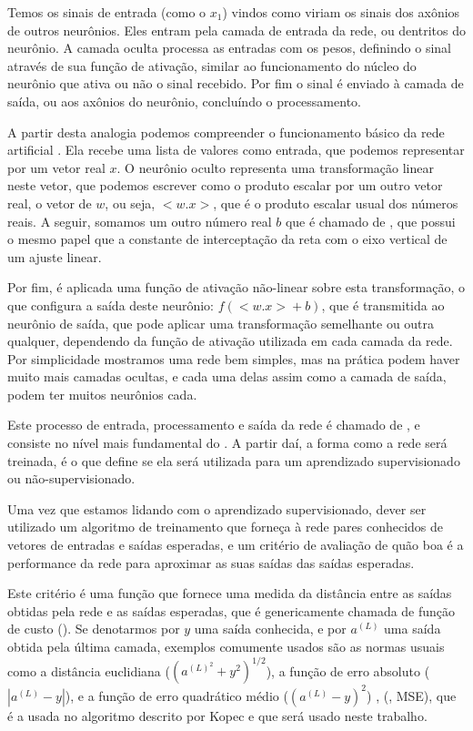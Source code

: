 Temos os sinais de entrada (como o $x_1$) vindos como viriam os sinais dos axônios de outros neurônios. Eles entram pela camada de entrada da rede, ou dentritos do neurônio. A camada oculta processa as entradas com os pesos, definindo o sinal através de sua função de ativação, similar ao funcionamento do núcleo do neurônio que ativa ou não o sinal recebido. Por fim o sinal é enviado à camada de saída, ou aos axônios do neurônio, concluíndo o processamento.

A partir desta analogia podemos compreender o funcionamento básico da rede artificial . Ela recebe uma lista de valores como entrada, que podemos representar por um vetor real $x$. O neurônio oculto representa uma transformação linear neste vetor, que podemos escrever como o produto escalar por um outro vetor real, o vetor de  $w$, ou seja, $<w.x>$, que é o produto escalar usual dos números reais. A seguir, somamos um outro número real $b$ que é chamado de , que possui o mesmo papel que a constante de interceptação da reta com o eixo vertical de um ajuste linear.

Por fim, é aplicada uma função de ativação não-linear sobre esta transformação, o que configura a saída deste neurônio: $f({<w.x>} + b)$, que é transmitida ao neurônio de saída, que pode aplicar uma transformação semelhante ou outra qualquer, dependendo da função de ativação utilizada em cada camada da rede. Por simplicidade mostramos uma rede bem simples, mas na prática podem haver muito mais camadas ocultas, e cada uma delas assim como a camada de saída, podem ter muitos neurônios cada.

Este processo de entrada, processamento e saída da rede é chamado de , e consiste no nível mais fundamental do . A partir daí, a forma como a rede será treinada, é o que define se ela será utilizada para um aprendizado supervisionado ou não-supervisionado.

Uma vez que estamos lidando com o aprendizado supervisionado, dever ser utilizado um algoritmo de treinamento que forneça à rede pares conhecidos de vetores de entradas e saídas esperadas, e um critério de avaliação de quão boa é a performance da rede para aproximar as suas saídas das saídas esperadas. 

Este critério é uma função que fornece uma medida da distância entre as saídas obtidas pela rede e as saídas esperadas, que é genericamente chamada de função de custo (). Se denotarmos por $y$ uma saída conhecida, e por $a^{(L)}$ uma saída obtida pela última camada, exemplos comumente usados são as normas usuais como a distância euclidiana ($(a^{(L)^2} + y^2)^{1/2}$), a função de erro absoluto ($|a^{(L)} - y|$), e a função de erro quadrático médio ($(a^{(L)} - y)^2$) , (, MSE), que é a usada no algoritmo descrito por Kopec \citep{classic} e que será usado neste trabalho.

